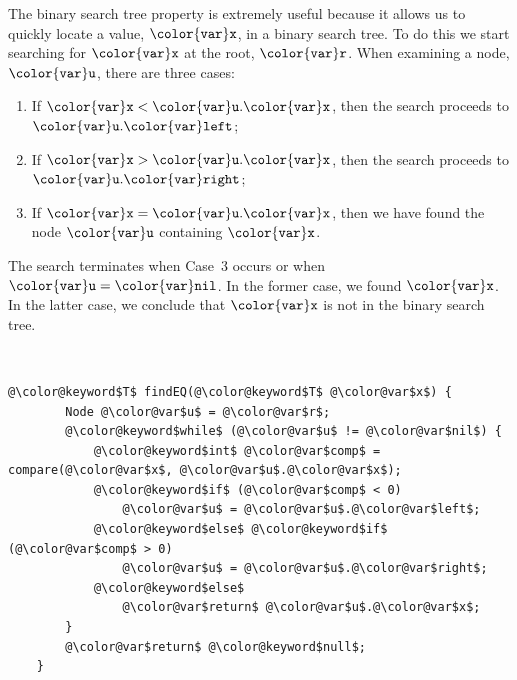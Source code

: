 \documentclass[10pt]{book}
\theoremstyle{plain}
\theoremstyle{definition}
\begin{document}
%
The binary search tree property is extremely useful because it allows
us to quickly locate a value, \ensuremath{\mathtt{{\color{var}x}}}, in a binary search tree.  To do this we start
searching for \ensuremath{\mathtt{{\color{var}x}}} at the root, \ensuremath{\mathtt{{\color{var}r}}}.  When examining a node, \ensuremath{\mathtt{{\color{var}u}}}, there
are three cases:
\begin{enumerate}
\item If $\ensuremath{\mathtt{{\color{var}x}}}< \ensuremath{\mathtt{{\color{var}u}.{\color{var}x}}}$, then the search proceeds to \ensuremath{\mathtt{{\color{var}u}.{\color{var}left}}};
\item If $\ensuremath{\mathtt{{\color{var}x}}}> \ensuremath{\mathtt{{\color{var}u}.{\color{var}x}}}$, then the search proceeds to \ensuremath{\mathtt{{\color{var}u}.{\color{var}right}}};
\item If $\ensuremath{\mathtt{{\color{var}x}}}= \ensuremath{\mathtt{{\color{var}u}.{\color{var}x}}}$, then we have found the node \ensuremath{\mathtt{{\color{var}u}}} containing \ensuremath{\mathtt{{\color{var}x}}}.
\end{enumerate}
The search terminates when Case~3 occurs or when \ensuremath{\mathtt{{\color{var}u}={\color{var}nil}}}.  In the
former case, we found \ensuremath{\mathtt{{\color{var}x}}}.  In the latter case, we conclude that \ensuremath{\mathtt{{\color{var}x}}}
is not in the binary search tree.


 \ \vspace{.5ex}\begin{Verbatim}[gobble=1,tabsize=2,frame=single,framerule=1.2pt,commandchars=\\@\$,label=\texttt{BinarySearchTree},labelposition=topline]
	@\color@keyword$T$ findEQ(@\color@keyword$T$ @\color@var$x$) {
		Node @\color@var$u$ = @\color@var$r$;
		@\color@keyword$while$ (@\color@var$u$ != @\color@var$nil$) {
			@\color@keyword$int$ @\color@var$comp$ = compare(@\color@var$x$, @\color@var$u$.@\color@var$x$);
			@\color@keyword$if$ (@\color@var$comp$ < 0) 
				@\color@var$u$ = @\color@var$u$.@\color@var$left$;
			@\color@keyword$else$ @\color@keyword$if$ (@\color@var$comp$ > 0)
				@\color@var$u$ = @\color@var$u$.@\color@var$right$;
			@\color@keyword$else$
				@\color@var$return$ @\color@var$u$.@\color@var$x$;
		}
		@\color@var$return$ @\color@keyword$null$;
	}
\end{Verbatim}
\end{document}
